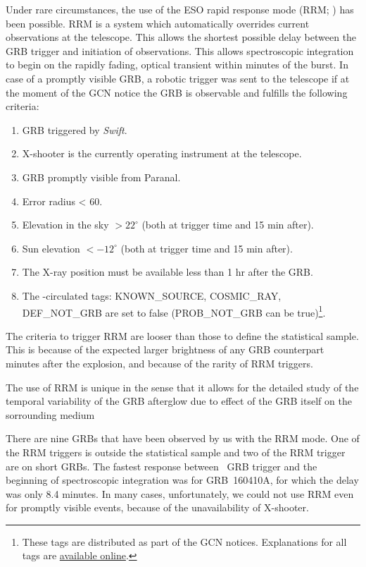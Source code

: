 \documentclass{aa}    %
\begin{document}
Under rare circumstances, the use of the ESO rapid response mode (RRM;
\citealt{Vreeswijk2010}) has been possible. RRM is a system which automatically
overrides current observations at the telescope. This allows the shortest
possible delay between the GRB trigger and initiation of observations. This
allows spectroscopic integration to begin on the rapidly fading, optical
transient within minutes of the burst. In case of a promptly visible GRB, a
robotic trigger was sent to the telescope if at the moment of the GCN notice the
GRB is observable and fulfills the following criteria:


\begin{enumerate}
	\item GRB triggered by \textit{Swift}.
	\item X-shooter is the currently operating instrument at the telescope.
	\item GRB promptly visible from Paranal.
	\item Error radius < 60\arcsec.
	\item Elevation in the sky $> 22^\circ$ (both at trigger time and 15 min after).
	\item Sun elevation $< -12^\circ$ (both at trigger time and 15 min after).
	\item The X-ray position must be available less than 1 hr after the GRB.
	\item The \swift-circulated tags: KNOWN\_SOURCE, COSMIC\_RAY, DEF\_NOT\_GRB are set to false (PROB\_NOT\_GRB can be true)\footnote{These tags are distributed as part of the GCN notices. Explanations for all tags are \href{https://gcn.gsfc.nasa.gov/sock_pkt_def_doc.html}{available online}.}. 
\end{enumerate}

The criteria to trigger RRM are looser than those to define the statistical
sample. This is because of the expected larger brightness of any GRB counterpart
minutes after the explosion, and because of the rarity of RRM triggers.

The use of RRM is unique in the sense that it allows for the detailed study of
the temporal variability of the GRB afterglow due to effect of the GRB itself on
the sorrounding medium \citep[e.g., see][]{Dessauges-Zavadsky2006,
	Vreeswijk2007, DElia2009, Vreeswijk2013}

There are nine GRBs that have been observed by us with the RRM mode. One of the
RRM triggers is outside the statistical sample  and two of the RRM trigger are
on short GRBs. The fastest response between \swift~GRB trigger and the beginning
of spectroscopic integration was for GRB~160410A, for which the delay was only
8.4 minutes. In many cases, unfortunately, we could not use RRM even for promptly visible events, because of the unavailability of X-shooter.
\end{document}
